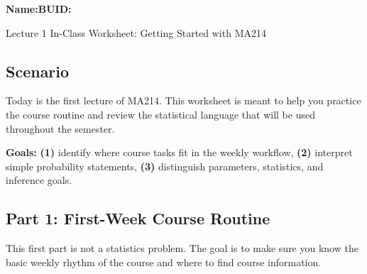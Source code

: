 \documentclass{article}
\newcommand{\blankline}[1]{\underline{\hspace{#1}}}
\begin{document}
\noindent\textbf{Name:}\blankline{2.25in}\hfill\textbf{BUID:}\blankline{1.55in}\newline

\begin{center}
 \Large Lecture 1 In-Class Worksheet: Getting Started with MA214
\end{center}

\subsection*{Scenario}
Today is the first lecture of MA214. This worksheet is meant to help you practice the course routine and review the statistical language that will be used throughout the semester.

\medskip
\noindent\textbf{Goals:} \textbf{(1)} identify where course tasks fit in the weekly workflow, \textbf{(2)} interpret simple probability statements, \textbf{(3)} distinguish parameters, statistics, and inference goals.

\subsection*{Part 1: First-Week Course Routine}
This first part is not a statistics problem. The goal is to make sure you know the basic weekly rhythm of the course and where to find course information.
\end{document}
